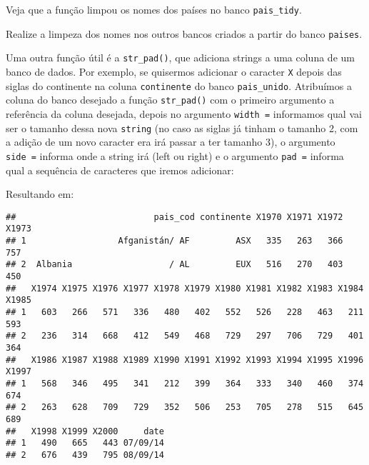 \documentclass[]{book}
\newenvironment{Shaded}{\begin{snugshade}}{\end{snugshade}}
\newcommand{\DataTypeTok}[1]{\textcolor[rgb]{0.13,0.29,0.53}{#1}}
\newcommand{\DecValTok}[1]{\textcolor[rgb]{0.00,0.00,0.81}{#1}}
\newcommand{\KeywordTok}[1]{\textcolor[rgb]{0.13,0.29,0.53}{\textbf{#1}}}
\newcommand{\NormalTok}[1]{#1}
\newcommand{\OperatorTok}[1]{\textcolor[rgb]{0.81,0.36,0.00}{\textbf{#1}}}
\newcommand{\StringTok}[1]{\textcolor[rgb]{0.31,0.60,0.02}{#1}}
\theoremstyle{definition}
\theoremstyle{definition}
\theoremstyle{definition}
\theoremstyle{remark}
\let\BeginKnitrBlock\begin \let\EndKnitrBlock\end
\begin{document}
\begin{Shaded}
\end{Shaded}

Veja que a função limpou os nomes dos países no banco \texttt{pais\_tidy}.

\BeginKnitrBlock{exercise}
\protect\hypertarget{exr:unnamed-chunk-135}{}{\label{exr:unnamed-chunk-135} }Realize a limpeza dos nomes nos outros bancos criados a partir do banco \texttt{paises}.
\EndKnitrBlock{exercise}

Uma outra função útil é a \texttt{str\_pad()}, que adiciona strings a uma coluna de um banco de dados. Por exemplo, se quisermos adicionar o caracter \texttt{X} depois das siglas do continente na coluna \texttt{continente} do banco \texttt{pais\_unido}. Atribuímos a coluna do banco desejado a função \texttt{str\_pad()} com o primeiro argumento a referência da coluna desejada, depois no argumento \texttt{width\ =} informamos qual vai ser o tamanho dessa nova \texttt{string} (no caso as siglas já tinham o tamanho 2, com a adição de um novo caracter era irá passar a ter tamanho 3), o argumento \texttt{side\ =} informa onde a string irá (left ou right) e o argumento \texttt{pad\ =} informa qual a sequência de caracteres que iremos adicionar:

\begin{Shaded}
\end{Shaded}

Resultando em:

\begin{verbatim}
##                           pais_cod continente X1970 X1971 X1972 X1973
## 1                  Afganistán/ AF         ASX   335   263   366   757
## 2  Albania                   / AL         EUX   516   270   403   450
##   X1974 X1975 X1976 X1977 X1978 X1979 X1980 X1981 X1982 X1983 X1984 X1985
## 1   603   266   571   336   480   402   552   526   228   463   211   593
## 2   236   314   668   412   549   468   729   297   706   729   401   364
##   X1986 X1987 X1988 X1989 X1990 X1991 X1992 X1993 X1994 X1995 X1996 X1997
## 1   568   346   495   341   212   399   364   333   340   460   374   674
## 2   263   628   709   729   352   506   253   705   278   515   645   689
##   X1998 X1999 X2000     date
## 1   490   665   443 07/09/14
## 2   676   439   795 08/09/14
\end{verbatim}
\end{document}
